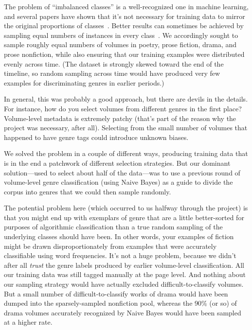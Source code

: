 \documentclass[paper=a4, fontsize=12pt]{scrartcl}
\numberwithin{equation}{section}		%
\numberwithin{figure}{section}			%
\numberwithin{table}{section}				%
\begin{document}
The problem of ``imbalanced classes'' is a well-recognized one in machine learning, and several papers have shown that it's not necessary for training data to mirror the original proportions of classes~\cite{japkowicz:imbalance}. Better results can sometimes be achieved by sampling equal numbers of instances in every class~\cite{weiss:imbalance}. We accordingly sought to sample roughly equal numbers of volumes in poetry, prose fiction, drama, and prose nonfiction, while also ensuring that our training examples were distributed evenly across time. (The dataset is strongly skewed toward the end of the timeline, so random sampling across time would have produced very few examples for discriminating genres in earlier periods.)

In general, this was probably a good approach, but there are devils in the details. For instance, how do you select volumes from different genres in the first place? Volume-level metadata is extremely patchy (that's part of the reason why the project was necessary, after all). Selecting from the small number of volumes that happened to have genre tags could introduce unknown biases.

We solved the problem in a couple of different ways, producing training data that is in the end a patchwork of different selection strategies. But our dominant solution---used to select about half of the data---was to use a previous round of volume-level genre classification (using Naive Bayes) as a guide to divide the corpus into genres that we could then sample randomly. 

The potential problem here (which occurred to us halfway through the project) is that you might end up with exemplars of genre that are a little better-sorted for purposes of algorithmic classification than a true random sampling of the underlying classes should have been. In other words, your examples of fiction might be drawn disproportionately from examples that were accurately classifiable using word frequencies. It's not a huge problem, because we didn't after all \textit{trust} the genre labels produced by earlier volume-level classification. All our training data was still tagged manually at the page level. And nothing about our sampling strategy would have actually excluded difficult-to-classify volumes. But a small number of difficult-to-classify works of drama would have been dumped into the sparsely-sampled nonfiction pool, whereas the 90\% (or so) of drama volumes accurately recognized by Naive Bayes would have been sampled at a higher rate.
\end{document}
